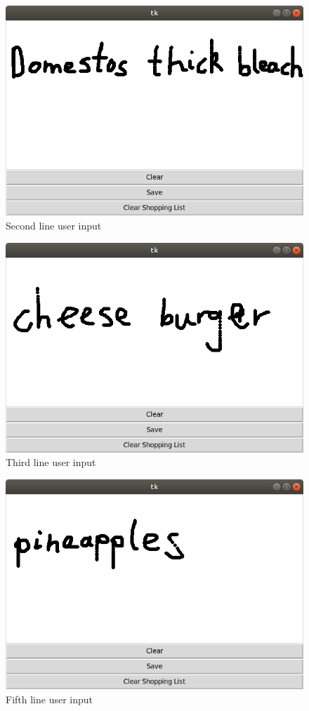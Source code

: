 \begin{figure}[h]
	\centering
	\includegraphics[scale=0.4]{102}
	\caption{Second line user input}
\end{figure}

\begin{figure}[h]
	\centering
	\includegraphics[scale=0.4]{103}
	\caption{Third line user input}
\end{figure}

\begin{figure}[h]
	\centering
	\includegraphics[scale=0.4]{105}
	\caption{Fifth line user input}
\end{figure}

